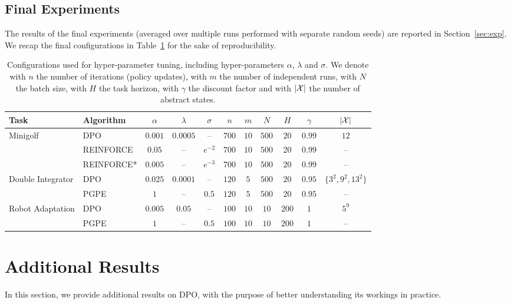 \subsection{Final Experiments}
The results of the final experiments (averaged over multiple runs performed with separate random seeds) are reported in Section~\ref{sec:exp}. 
We recap the final configurations in Table~\ref{tab:recap2} for the sake of reproducibility.

\begin{table}[h!]
	\centering
	\begin{tabular}{ll|ccccccccc}
		\toprule
		\textbf{Task} & \textbf{Algorithm} & $\alpha$ & $\lambda$ & $\sigma$ & $n$ & $m$ & $N$ & $H$ & \textbf{$\gamma$} & $|\mathcal{X}|$\\
		\midrule
		Minigolf & DPO & $0.001$ & $0.0005$ & -- & $700$ & $10$ & $500$ & 20 & $0.99$ & $12$ \\
		& REINFORCE & $0.05$ & -- & $e^{-2}$ & $700$ & $10$ & $500$ & 20 & $0.99$ & -- \\
		& REINFORCE* & $0.005$ & -- & $e^{-3}$ & $700$ & $10$ & $500$ & 20 & $0.99$ & -- \\
		\midrule
		Double Integrator & DPO & $0.025$ & $0.0001$ & -- & $120$ & $5$ & $500$ & $20$ & $0.95$ & $\{3^{2},9^{2},13^{2}\}$ \\
		& PGPE & $1$ & -- & $0.5$ & $120$ & $5$ & $500$ & $20$ & $0.95$ & -- \\
		\midrule
		Robot Adaptation & DPO & $0.005$ & $0.05$ & -- & $100$ & $10$ & $10$ & $200$ & $1$ & $5^{9}$ \\
		& PGPE & $1$ & -- & $0.5$ & $100$ & $10$ & $10$ & $200$ & $1$ & --\\
		\midrule
	\end{tabular}
	\caption{\label{tab:recap2}Configurations used for hyper-parameter tuning, including hyper-parameters $\alpha$, $\lambda$ and $\sigma$. We denote with $n$ the number of iterations (policy updates), with $m$ the number of independent runs, with $N$ the batch size, with $H$ the task horizon, with $\gamma$ the discount factor and with $|\mathcal{X}|$ the number of abstract states.}
\end{table}


\section{Additional Results}\label{sec:app5}
In this section, we provide additional results on DPO, with the purpose of better understanding its workings in practice. 

